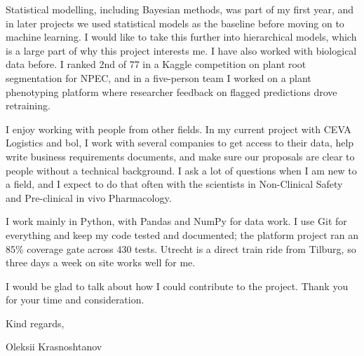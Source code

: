 \documentclass[letterpaper,11pt]{article}
\begin{document}
Statistical modelling, including Bayesian methods, was part of my first year,
and in later projects we used statistical models as the baseline before moving
on to machine learning. I would like to take this further into hierarchical
models, which is a large part of why this project interests me. I have also
worked with biological data before. I ranked 2nd of 77 in a Kaggle competition
on plant root segmentation for NPEC, and in a five-person team I worked on a
plant phenotyping platform where researcher feedback on flagged predictions
drove retraining.

I enjoy working with people from other fields. In my current project with CEVA
Logistics and bol, I work with several companies to get access to their data,
help write business requirements documents, and make sure our proposals are
clear to people without a technical background. I ask a lot of questions when I
am new to a field, and I expect to do that often with the scientists in
Non-Clinical Safety and Pre-clinical in vivo Pharmacology.

I work mainly in Python, with Pandas and NumPy for data work. I use Git for
everything and keep my code tested and documented; the platform project ran an
85\% coverage gate across 430 tests. Utrecht is a direct train ride from
Tilburg, so three days a week on site works well for me.

I would be glad to talk about how I could contribute to the project. Thank you
for your time and consideration.

Kind regards,

Oleksii Krasnoshtanov
\end{document}
